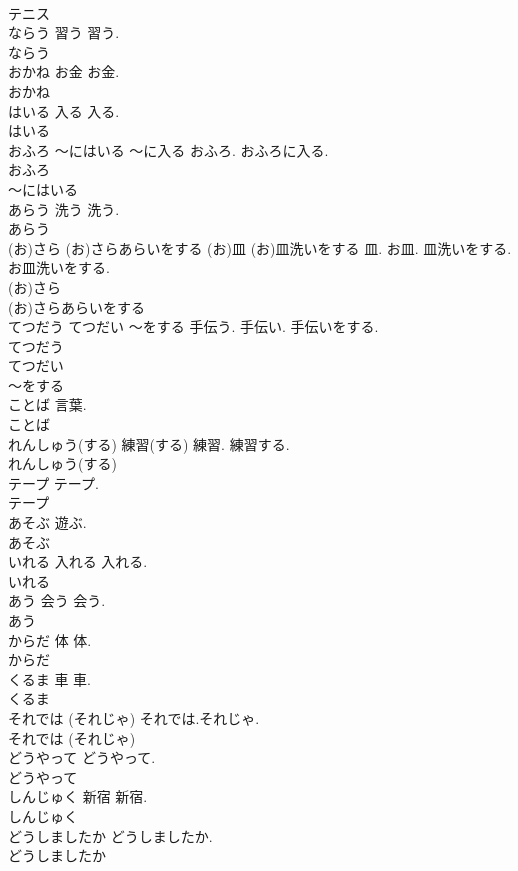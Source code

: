 \documentclass[8pt]{extreport}
\begin{document}
\begin{CJK}{UTF8}{min}
\\	テニス
\\	ならう	習う	習う.	
\\	ならう
\\	おかね	お金	お金.	
\\	おかね
\\	はいる	入る	入る.	
\\	はいる
\\	おふろ ～にはいる	～に入る	おふろ. おふろに入る.	
\\	おふろ
\\	～にはいる
\\	あらう	洗う	洗う.	
\\	あらう
\\	(お)さら (お)さらあらいをする	(お)皿 (お)皿洗いをする	皿. お皿. 皿洗いをする. お皿洗いをする.	
\\	(お)さら
\\	(お)さらあらいをする
\\	てつだう てつだい ～をする		手伝う. 手伝い. 手伝いをする.	
\\	てつだう
\\	てつだい
\\	～をする
\\	ことば		言葉.	
\\	ことば
\\	れんしゅう(する)	練習(する)	練習. 練習する.	
\\	れんしゅう(する)
\\	テープ		テープ.	
\\	テープ
\\	あそぶ		遊ぶ.	
\\	あそぶ
\\	いれる	入れる	入れる.	
\\	いれる
\\	あう	会う	会う.	
\\	あう
\\	からだ	体	体.	
\\	からだ
\\	くるま	車	車.	
\\	くるま
\\	それでは (それじゃ)		それでは.それじゃ.	
\\	それでは (それじゃ)
\\	どうやって		どうやって.	
\\	どうやって
\\	しんじゅく	新宿	新宿.	
\\	しんじゅく
\\	どうしましたか		どうしましたか.	
\\	どうしましたか

\end{CJK}
\end{document}
